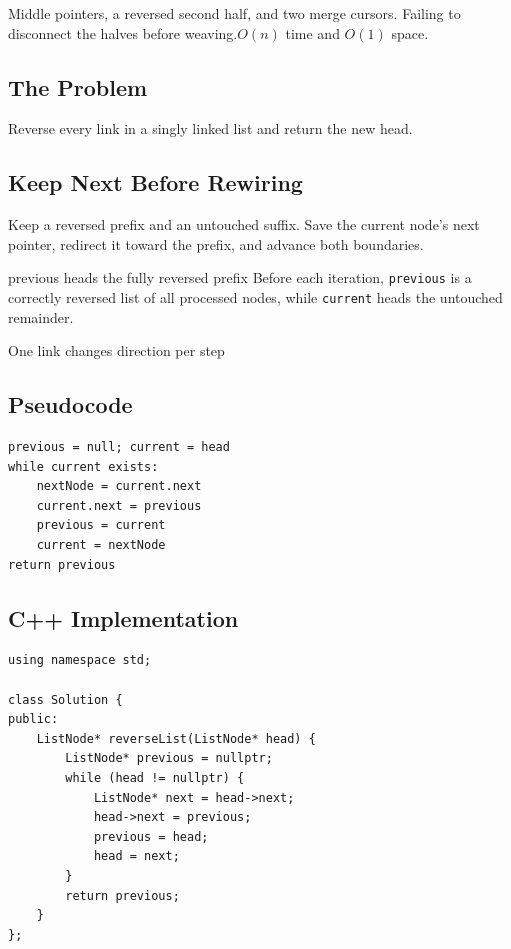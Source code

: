   {Middle pointers, a reversed second half, and two merge cursors.}
  {Failing to disconnect the halves before weaving.}{$O(n)$ time and $O(1)$ space.}



\subsection{The Problem}
Reverse every link in a singly linked list and return the new head.

\subsection{Keep Next Before Rewiring}
Keep a reversed prefix and an untouched suffix. Save the current node's
next pointer, redirect it toward the prefix, and advance both boundaries.

\begin{invariantbox}{previous heads the fully reversed prefix}
Before each iteration, \texttt{previous} is a correctly reversed list of all
processed nodes, while \texttt{current} heads the untouched remainder.
\end{invariantbox}

\begin{visualbox}{One link changes direction per step}
\centering
{}
\end{visualbox}

\subsection{Pseudocode}
\begin{lstlisting}[style=pseudocode]
previous = null; current = head
while current exists:
    nextNode = current.next
    current.next = previous
    previous = current
    current = nextNode
return previous
\end{lstlisting}

\subsection{C++ Implementation}
\begin{lstlisting}[style=compactcode,caption={Complete C++ solution: Reverse Linked List}]
using namespace std;

class Solution {
public:
    ListNode* reverseList(ListNode* head) {
        ListNode* previous = nullptr;
        while (head != nullptr) {
            ListNode* next = head->next;
            head->next = previous;
            previous = head;
            head = next;
        }
        return previous;
    }
};
\end{lstlisting}

